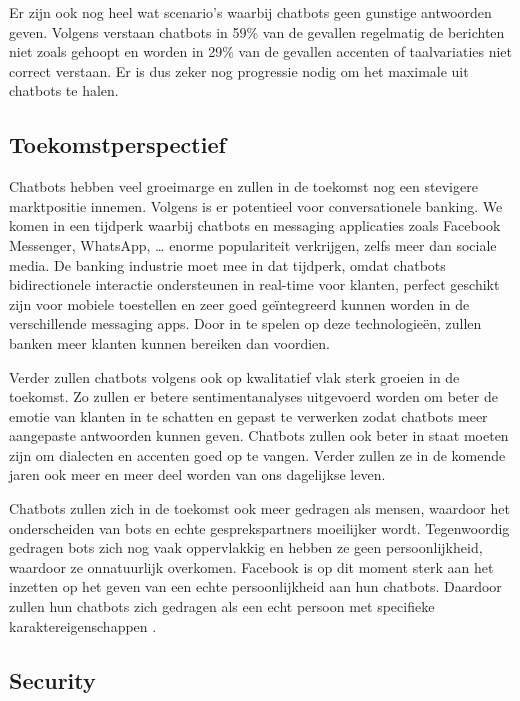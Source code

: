 Er zijn ook nog heel wat scenario’s waarbij chatbots geen gunstige antwoorden geven. Volgens \textcite{BRAIN2019} verstaan chatbots in 59\% van de gevallen regelmatig de berichten niet zoals gehoopt en worden in 29\% van de gevallen accenten of taalvariaties niet correct verstaan. Er is dus zeker nog progressie nodig om het maximale uit chatbots te halen.

\subsection{Toekomstperspectief}
\label{subsec:toekomstperspectief}

Chatbots hebben veel groeimarge en zullen in de toekomst nog een stevigere marktpositie innemen. Volgens \textcite{Andreoli2017} is er potentieel voor conversationele banking. We komen in een tijdperk waarbij chatbots en messaging applicaties zoals Facebook Messenger, WhatsApp, … enorme populariteit verkrijgen, zelfs meer dan sociale media. De banking industrie moet mee in dat tijdperk, omdat chatbots bidirectionele interactie ondersteunen in real-time voor klanten, perfect geschikt zijn voor mobiele toestellen en zeer goed geïntegreerd kunnen worden in de verschillende messaging apps. Door in te spelen op deze technologieën, zullen banken meer klanten kunnen bereiken dan voordien.

Verder zullen chatbots volgens \textcite{Patel2020} ook op kwalitatief vlak sterk groeien in de toekomst. Zo zullen er betere sentimentanalyses uitgevoerd worden om beter de emotie van klanten in te schatten en gepast te verwerken zodat chatbots meer aangepaste antwoorden kunnen geven. Chatbots zullen ook beter in staat moeten zijn om dialecten en accenten goed op te vangen. Verder zullen ze in de komende jaren ook meer en meer deel worden van ons dagelijkse leven.  

Chatbots zullen zich in de toekomst ook meer gedragen als mensen, waardoor het onderscheiden van bots en echte gesprekspartners moeilijker wordt. Tegenwoordig gedragen bots zich nog vaak oppervlakkig en hebben ze geen persoonlijkheid, waardoor ze onnatuurlijk overkomen. Facebook is op dit moment sterk aan het inzetten op het geven van een echte persoonlijkheid aan hun chatbots. Daardoor zullen hun chatbots zich gedragen als een echt persoon met specifieke karaktereigenschappen \autocite{Carey-Simos2018}.

\subsection{Security}
\label{subsec:security}

